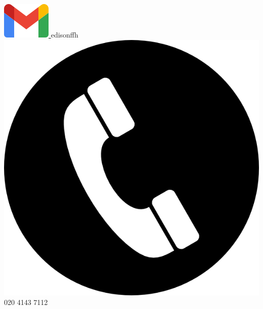 \begin{center}
    \href{mailto:edisonffh@gmail.com}{
        \includegraphics[scale=0.25]{figs/gmail_icon.png}
    } edisonffh
    \hspace*{5mm}
    \includegraphics[scale=0.3]{figs/phone.png}
    020 4143 7112
    \hspace*{5mm}

\end{center}
